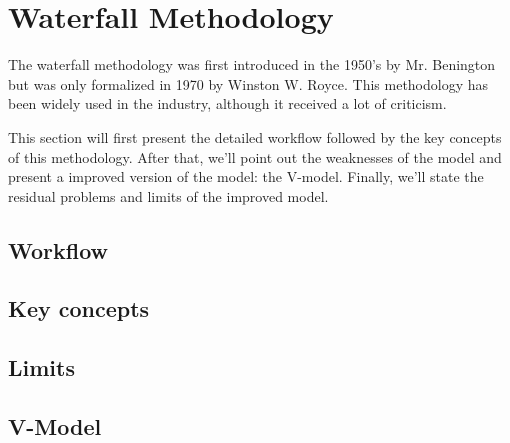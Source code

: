 \section{Waterfall Methodology}\label{sec:waterfall-methodology}
The waterfall methodology was first introduced in the 1950's by Mr.
Benington but was only formalized in 1970 by  Winston W. Royce.
This methodology has been widely used in the industry, although it received
a lot of criticism.

This section will first present the detailed workflow followed by the key
concepts of this methodology.
After that, we'll point out the weaknesses of the model and present a
improved version of the model: the V-model.
Finally, we'll state the residual problems and limits of the improved model.

\subsection{Workflow}\label{subsec:workflow}

\subsection{Key concepts}\label{subsec:key-concepts}

\subsection{Limits}\label{subsec:limits}

\subsection{V-Model}\label{subsec:v-model}